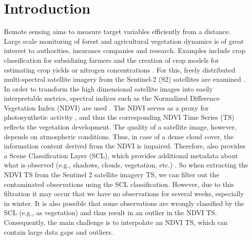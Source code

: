 \chapter{Introduction}

Remote sensing aims to measure target variables efficiently from a distance. 
Large scale monitoring of forest and agricultural vegetation dynamics is of great interest to authorities, insurance companies and research. Examples include crop classification for subsidizing farmers \citep{henitsSentinel2EnablesNationwide2022} and the creation of crop models for estimating crop yields or nitrogen concentrations \citep{couraultSTICSCropModel2021,perichCropNitrogenRetrieval2021}. 
For this, freely distributed multi-spectral satellite imagery from the  Sentinel-2 (S2) satellites are examined \citep{esaSentinel22022}.
In order to transform the high dimensional satellite images into easily interpretable metrics, spectral indices such as the Normalized Difference Vegetation Index (NDVI) are used \citep{rouseMonitoringVernalAdvancement1974}. The NDVI serves as a proxy for photosynthetic activity \citep{gamonRelationshipsNDVICanopy1995a}, and thus the corresponding {NDVI Time Series ({TS})} reflects the vegetation development. 
The quality of a satellite image, however, depends on atmospheric conditions. Thus, in case of a dense cloud cover, the information content derived from the NDVI is impaired. Therefore, \cite{esaEuropeanSpaceAgency2022} also provides a Scene Classification Layer (SCL), which provides additional metadata about what is observed (e.g., shadows, clouds, vegetation, etc.) . So when extracting the NDVI {TS} from the Sentinel 2 satellite imagery {TS}, we can filter out the contaminated observations using the SCL classification. However, due to this filtration it may occur that we have no observations for several weeks, especially in winter. It is also possible that some observations are wrongly classified by the SCL (e.g., as vegetation) and thus result in an outlier in the NDVI TS. Consequently, the main challenge is to interpolate an NDVI {TS}, which can contain large data gaps and outliers. 

